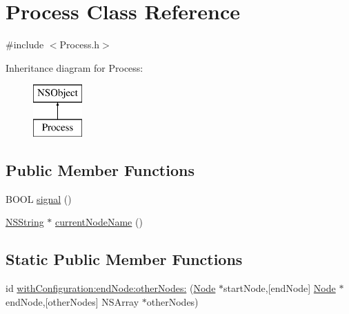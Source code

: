 \hypertarget{interface_process}{
\section{\-Process \-Class \-Reference}
\label{interface_process}
}


{\ttfamily \#include $<$\-Process.\-h$>$}

\-Inheritance diagram for \-Process\-:\begin{figure}[H]
\begin{center}
\leavevmode
\includegraphics[height=2.000000cm]{interface_process}
\end{center}
\end{figure}
\subsection*{\-Public \-Member \-Functions}
\begin{DoxyCompactItemize}
\item 
\-B\-O\-O\-L \hyperlink{interface_process_a796babc99f80a32ff985bfcc5c6ad899}{signal} ()
\item 
\hyperlink{class_n_s_string}{\-N\-S\-String} $\ast$ \hyperlink{interface_process_a2f155879cd902ed79d682daa867425db}{current\-Node\-Name} ()
\end{DoxyCompactItemize}
\subsection*{\-Static \-Public \-Member \-Functions}
\begin{DoxyCompactItemize}
\item 
id \hyperlink{interface_process_a7a3fb567a502a7b3ea44f867bc213450}{with\-Configuration\-:end\-Node\-:other\-Nodes\-:} (\hyperlink{interface_node}{\-Node} $\ast$start\-Node,\mbox{[}end\-Node\mbox{]} \hyperlink{interface_node}{\-Node} $\ast$end\-Node,\mbox{[}other\-Nodes\mbox{]} \-N\-S\-Array $\ast$other\-Nodes)
\end{DoxyCompactItemize}
